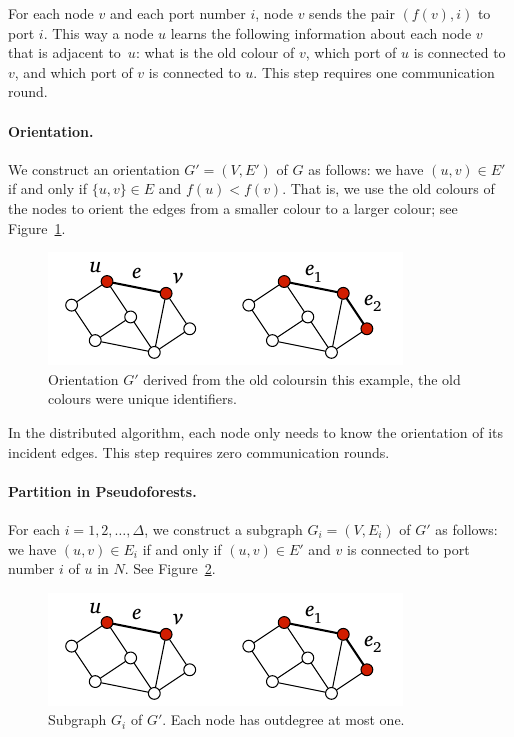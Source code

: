 For each node $v$ and each port number $i$, node $v$ sends the pair $(f(v), i)$ to port $i$. This way a node $u$ learns the following information about each node $v$ that is adjacent to~$u$: what is the old colour of $v$, which port of $u$ is connected to $v$, and which port of $v$ is connected to $u$. This step requires one communication round.

\paragraph{Orientation.}

We construct an orientation $G' = (V,E')$ of $G$ as follows: we have $(u,v) \in E'$ if and only if $\{u,v\} \in E$ and $f(u) < f(v)$. That is, we use the old colours of the nodes to orient the edges from a smaller colour to a larger colour; see Figure~\ref{fig:id-orient}.

\begin{figure}
    \centering
    \includegraphics[page=\PIdOrient]{figs.pdf}
    \caption{Orientation $G'$ derived from the old colours\mydash in this example, the old colours were unique identifiers.}\label{fig:id-orient}
\end{figure}

In the distributed algorithm, each node only needs to know the orientation of its incident edges. This step requires zero communication rounds.

\paragraph{Partition in Pseudoforests.}

For each $i = 1,2,\dotsc,\Delta$, we construct a subgraph $G_i = (V,E_i)$ of $G'$ as follows: we have $(u,v) \in E_i$ if and only if $(u,v) \in E'$ and $v$ is connected to port number $i$ of $u$ in $N$. See Figure~\ref{fig:id-pick-class}.

\begin{figure}
    \centering
    \includegraphics[page=\PIdPickClass]{figs.pdf}
    \caption{Subgraph $G_i$ of $G'$. Each node has outdegree at most one.}\label{fig:id-pick-class}
\end{figure}
    
